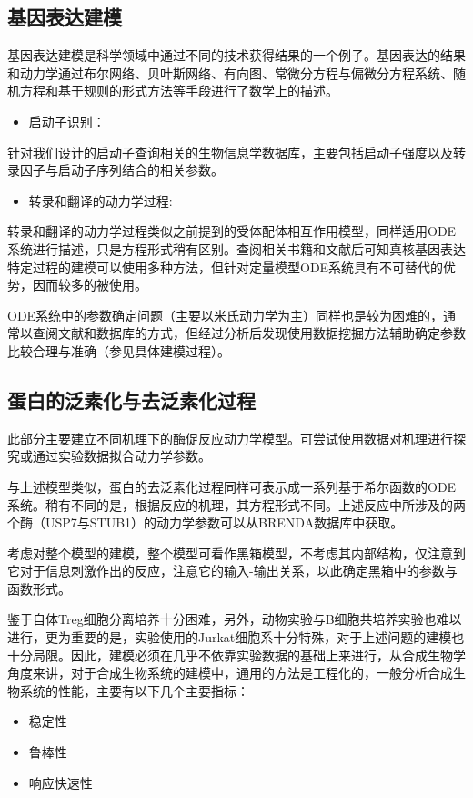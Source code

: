 \documentclass[withoutpreface,bwprint]{cumcmthesis} %
\begin{document}
\subsection{基因表达建模}
基因表达建模是科学领域中通过不同的技术获得结果的一个例子。基因表达的结果和动力学通过布尔网络、贝叶斯网络、有向图、常微分方程与偏微分方程系统、随机方程和基于规则的形式方法等手段进行了数学上的描述。
\begin{itemize}
\item 启动子识别：
\end{itemize}

针对我们设计的启动子查询相关的生物信息学数据库，主要包括启动子强度以及转录因子与启动子序列结合的相关参数。

\begin{itemize}
\item 转录和翻译的动力学过程:
\end{itemize}
	
转录和翻译的动力学过程类似之前提到的受体配体相互作用模型，同样适用ODE系统进行描述，只是方程形式稍有区别。查阅相关书籍和文献后可知真核基因表达特定过程的建模可以使用多种方法，但针对定量模型ODE系统具有不可替代的优势，因而较多的被使用。

ODE系统中的参数确定问题（主要以米氏动力学为主）同样也是较为困难的，通常以查阅文献和数据库的方式，但经过分析后发现使用数据挖掘方法辅助确定参数比较合理与准确（参见具体建模过程）。

\subsection{蛋白的泛素化与去泛素化过程}

\begin{center}
\end{center}

此部分主要建立不同机理下的酶促反应动力学模型。可尝试使用数据对机理进行探究或通过实验数据拟合动力学参数。

与上述模型类似，蛋白的去泛素化过程同样可表示成一系列基于希尔函数的ODE系统。稍有不同的是，根据反应的机理，其方程形式不同。上述反应中所涉及的两个酶（USP7与STUB1）的动力学参数可以从BRENDA数据库中获取。

考虑对整个模型的建模，整个模型可看作黑箱模型，不考虑其内部结构，仅注意到它对于信息刺激作出的反应，注意它的输入-输出关系，以此确定黑箱中的参数与函数形式。


鉴于自体Treg细胞分离培养十分困难，另外，动物实验与B细胞共培养实验也难以进行，更为重要的是，实验使用的Jurkat细胞系十分特殊，对于上述问题的建模也十分局限。因此，建模必须在几乎不依靠实验数据的基础上来进行，从合成生物学角度来讲，对于合成生物系统的建模中，通用的方法是工程化的，一般分析合成生物系统的性能，主要有以下几个主要指标：
\begin{itemize}[itemindent=1em]
	\item 稳定性
	\item 鲁棒性
	\item 响应快速性
\end{itemize}
\end{document}
